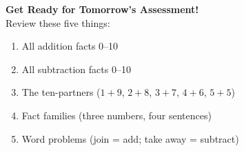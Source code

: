 \documentclass[12pt, letterpaper]{article}
\begin{document}
\bigskip
\begin{checkbox}
\textbf{\color{sd-green}Get Ready for Tomorrow's Assessment!}\\[3pt]
Review these five things:
\begin{enumerate}[leftmargin=2em,itemsep=2pt]
  \item All addition facts 0–10
  \item All subtraction facts 0–10
  \item The ten-partners ($1+9$, $2+8$, $3+7$, $4+6$, $5+5$)
  \item Fact families (three numbers, four sentences)
  \item Word problems (join = add; take away = subtract)
\end{enumerate}
\end{checkbox}
\end{document}
